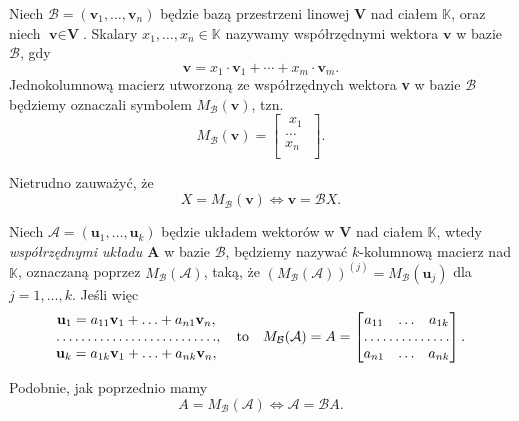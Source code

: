 	\begin{df}
		Niech $\mathcal{B} =(\textbf{v}_1, \ldots, \textbf{v}_n)$ będzie bazą przestrzeni linowej \textbf{V} nad ciałem $\mathbb{K}$, oraz niech $\textbf{v} \in \textbf{V}$.
		Skalary $x_1, \ldots, x_n \in \mathbb{K}$ nazywamy współrzędnymi wektora $\textbf{v}$ w bazie $\mathcal{B}$, gdy
		\begin{equation*}
			\textbf{v} =  x_1 \cdot \textbf{v}_1 + \cdots + x_m \cdot \textbf{v}_m.
		\end{equation*}
		Jednokolumnową macierz utworzoną ze współrzędnych wektora \textbf{v} w bazie $\mathcal{B}$ będziemy oznaczali symbolem $M_{\mathcal{B}}(\textbf{v})$, tzn.
		\begin{equation*}
			M_{\mathcal{B}}(\textbf{v}) = 
			\begin{bmatrix}
				\; x_1 \; \\
				\ldots \\
				x_n \\
			\end{bmatrix}.
		\end{equation*}
	\end{df}
	
 	Nietrudno zauważyć, że 
 	\begin{equation*}
 	X = M_{\mathcal{B}}(\textbf{v}) \Longleftrightarrow \textbf{v} = \mathcal{B}X.
 	\end{equation*}
 	
 	\begin{df} 		
	 	Niech $\mathcal{A} = (\textbf{u}_1, \ldots, \textbf{u}_k)$ będzie układem wektorów w \textbf{V} nad ciałem $\mathbb{K}$, wtedy \textit{współrzędnymi układu $\textbf{A}$} w bazie $\mathcal{B}$, będziemy nazywać $k$-kolumnową macierz nad $\mathbb{K}$, oznaczaną poprzez $M_{\mathcal{B}}(\mathcal{A})$,  taką, że $(M_{\mathcal{B}}(\mathcal{A}))^{(j)} = M_{\mathcal{B}}(\textbf{u}_j)$ dla $ j = 1, \ldots, k$. Jeśli więc 
	 	\begin{equation*}
	 		\begin{matrix}
				\textbf{u}_1 = a_{11}\textbf{v}_1 + \ldots + a_{n1}\textbf{v}_n, \\
				\hdotsfor{1} \\
				\textbf{u}_k = a_{1k}\textbf{v}_1 + \ldots + a_{nk}\textbf{v}_n, \\
	 		\end{matrix}, 
	 		\quad \text{to} \quad 		
	 		M_{\mathcal{B}}(\mathcal{A}) = A = 
	 		\begin{bmatrix}
		 		a_{11} & \ldots & a_{1k} \\ 
		 		\hdotsfor{3} \\ 
		 		a_{n1} & \ldots & a_{nk} \\ 
	 		\end{bmatrix}. 		
	 	\end{equation*} 	
 	 \end{df}
 	Podobnie, jak poprzednio mamy 	
 	\begin{equation*}
 		A = M_{\mathcal{B}}(\mathcal{A}) \Longleftrightarrow \mathcal{A} = \mathcal{B}A.
 	\end{equation*}
 	

